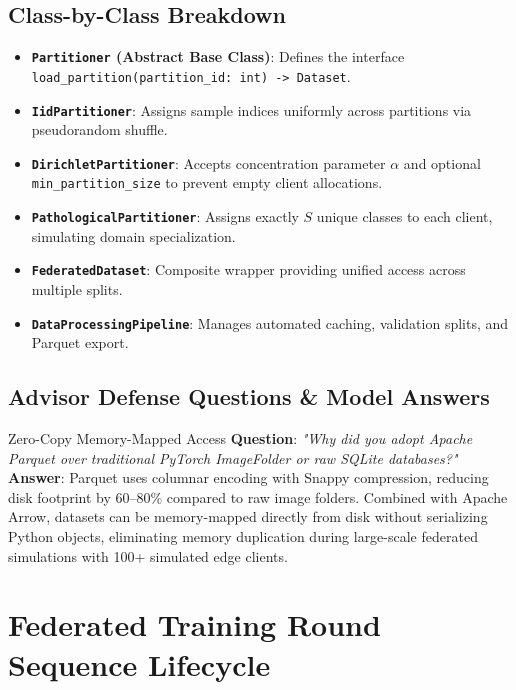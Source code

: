 \documentclass[11pt,a4paper,titlepage]{report}
\begin{document}
\section{Class-by-Class Breakdown}
\begin{itemize}[leftmargin=*]
    \item \textbf{\texttt{Partitioner} (Abstract Base Class)}: Defines the interface \texttt{load\_partition(partition\_id: int) -> Dataset}.
    \item \textbf{\texttt{IidPartitioner}}: Assigns sample indices uniformly across partitions via pseudorandom shuffle.
    \item \textbf{\texttt{DirichletPartitioner}}: Accepts concentration parameter $\alpha$ and optional \texttt{min\_partition\_size} to prevent empty client allocations.
    \item \textbf{\texttt{PathologicalPartitioner}}: Assigns exactly $S$ unique classes to each client, simulating domain specialization.
    \item \textbf{\texttt{FederatedDataset}}: Composite wrapper providing unified access across multiple splits.
    \item \textbf{\texttt{DataProcessingPipeline}}: Manages automated caching, validation splits, and Parquet export.
\end{itemize}

\section{Advisor Defense Questions \& Model Answers}
\begin{defenseqa}{Zero-Copy Memory-Mapped Access}
\textbf{Question}: \textit{"Why did you adopt Apache Parquet over traditional PyTorch ImageFolder or raw SQLite databases?"}\\
\textbf{Answer}: Parquet uses columnar encoding with Snappy compression, reducing disk footprint by $60\text{--}80\%$ compared to raw image folders. Combined with Apache Arrow, datasets can be memory-mapped directly from disk without serializing Python objects, eliminating memory duplication during large-scale federated simulations with 100+ simulated edge clients.
\end{defenseqa}

\chapter{Federated Training Round Sequence Lifecycle}
\label{chap:round_lifecycle}
\end{document}
